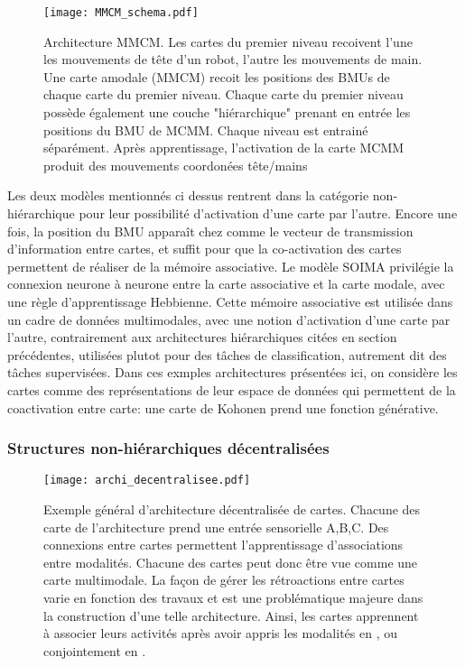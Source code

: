 \documentclass[../main]{subfiles}
\begin{document}
\begin{figure}
    \centering
    \texttt{[image: MMCM\_schema.pdf]}
    \caption{Architecture MMCM. Les cartes du premier niveau recoivent l'une les mouvements de tête d'un robot, l'autre les mouvements de main. 
    Une carte amodale (MMCM) recoit les positions des BMUs de chaque carte du premier niveau. Chaque carte du premier niveau possède également une couche "hiérarchique" prenant en entrée les positions du BMU de MCMM. Chaque niveau est entrainé séparément.
    Après apprentissage, l'activation de la carte MCMM produit des mouvements coordonées tête/mains~\cite{dominey13}\label{fig:mmcm}}
\end{figure}

Les deux modèles mentionnés ci dessus rentrent dans la catégorie non-hiérarchique pour leur possibilité d'activation d'une carte par l'autre. Encore une fois, la position du BMU apparaît chez \cite{dominey13} comme le vecteur de transmission d'information  entre cartes, et suffit pour que la co-activation des cartes permettent de réaliser de la mémoire associative. Le modèle SOIMA privilégie la connexion neurone à neurone entre la carte associative et la carte modale, avec une règle d'apprentissage Hebbienne.
Cette mémoire associative est utilisée dans un cadre de données multimodales, avec une notion d'activation d'une carte par l'autre, contrairement aux architectures hiérarchiques citées en section précédentes, utilisées plutot pour des tâches de classification, autrement dit des tâches supervisées.
Dans ces exmples architectures présentées ici, on considère les cartes comme des représentations de leur espace de données qui permettent de la coactivation entre carte: une carte de Kohonen prend une fonction générative.

\subsubsection{Structures non-hiérarchiques décentralisées}

\begin{figure}
    \texttt{[image: archi\_decentralisee.pdf]}
    \caption{Exemple général d'architecture décentralisée de cartes. Chacune des carte de l'architecture prend une entrée sensorielle A,B,C. Des connexions entre cartes permettent l'apprentissage d'associations entre modalités. Chacune des cartes peut donc être vue comme une carte multimodale. La façon de gérer les rétroactions entre cartes varie en fonction des travaux et est une problématique majeure dans la construction d'une telle architecture. Ainsi, les cartes apprennent à associer leurs activités après avoir appris les modalités en \cite{khacef_brain-inspired_2020}, ou conjointement en \cite{johnsson_associative_2009}.}
\end{figure}
\end{document}
